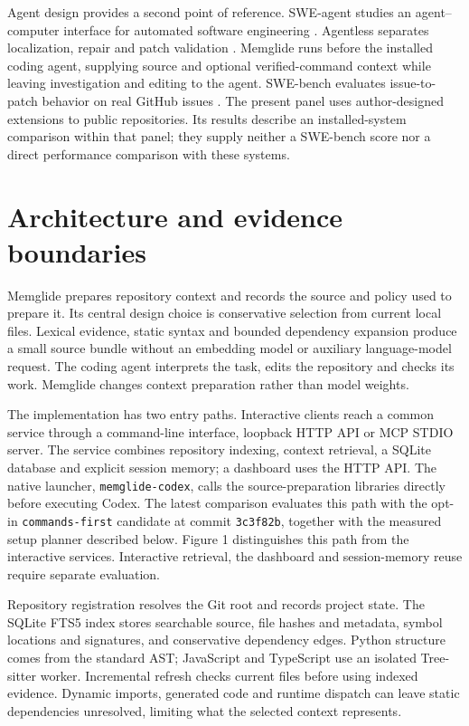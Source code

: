 \documentclass[manuscript,screen,nonacm]{acmart}
\begin{document}
Agent design provides a second point of reference. SWE-agent studies an
agent--computer interface for automated software engineering
\citep{yang2024sweagent}. Agentless separates localization, repair and
patch validation \citep{agentless}. Memglide runs before the installed
coding agent, supplying source and optional verified-command context
while leaving investigation and editing to the agent. SWE-bench
evaluates issue-to-patch behavior on real GitHub issues
\citep{jimenez2024swebench}. The present panel uses author-designed
extensions to public repositories. Its results describe an
installed-system comparison within that panel; they supply neither a
SWE-bench score nor a direct performance comparison with these systems.

\section{Architecture and evidence
boundaries}\label{architecture-and-evidence-boundaries}

Memglide prepares repository context and records the source and policy
used to prepare it. Its central design choice is conservative selection
from current local files. Lexical evidence, static syntax and bounded
dependency expansion produce a small source bundle without an embedding
model or auxiliary language-model request. The coding agent interprets
the task, edits the repository and checks its work. Memglide changes
context preparation rather than model weights.

The implementation has two entry paths. Interactive clients reach a
common service through a command-line interface, loopback HTTP API or
MCP STDIO server. The service combines repository indexing, context
retrieval, a SQLite database and explicit session memory; a dashboard
uses the HTTP API. The native launcher, \texttt{memglide-codex}, calls
the source-preparation libraries directly before executing Codex. The
latest comparison evaluates this path with the opt-in
\texttt{commands-first} candidate at commit \texttt{3c3f82b}, together
with the measured setup planner described below. Figure 1 distinguishes
this path from the interactive services. Interactive retrieval, the
dashboard and session-memory reuse require separate evaluation.

Repository registration resolves the Git root and records project state.
The SQLite FTS5 index stores searchable source, file hashes and
metadata, symbol locations and signatures, and conservative dependency
edges. Python structure comes from the standard AST; JavaScript and
TypeScript use an isolated Tree-sitter worker. Incremental refresh
checks current files before using indexed evidence. Dynamic imports,
generated code and runtime dispatch can leave static dependencies
unresolved, limiting what the selected context represents.
\end{document}
